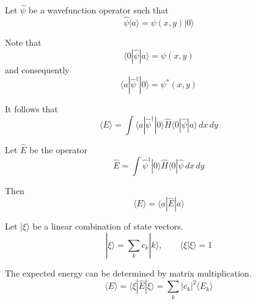 \documentclass[12pt]{article}
\begin{document}
\noindent
Let $\hat{\psi}$ be a wavefunction operator such that
\begin{equation*}
\hat{\psi}|a\rangle=\psi(x,y)|0\rangle
\end{equation*}

\noindent
Note that
\begin{equation*}
\langle0|\hat{\psi}|a\rangle=\psi(x,y)
\end{equation*}
and consequently
\begin{equation*}
\langle a|\hat{\psi}^\dag|0\rangle=\psi^*(x,y)
\end{equation*}

\noindent
It follows that
\begin{equation*}
\langle E\rangle=\int
\langle a|\hat{\psi}^\dag|0\rangle
\hat{H}
\langle0|\hat{\psi}|a\rangle
\,dx\,dy
\end{equation*}

\noindent
Let $\hat{E}$ be the operator
\begin{equation*}
\hat{E}=\int\hat{\psi}^\dag|0\rangle\hat{H}\langle0|\hat{\psi}\,dx\,dy
\end{equation*}

\noindent
Then
\begin{equation*}
\langle E\rangle=\langle a|\hat{E}|a\rangle
\end{equation*}

\noindent
Let $|\xi\rangle$ be a linear combination of state vectors.
\begin{equation*}
|\xi\rangle=\sum_kc_k|k\rangle,\qquad\langle\xi|\xi\rangle=1
\end{equation*}

\noindent
The expected energy can be determined by matrix multiplication.
\begin{equation*}
\langle E\rangle=\langle\xi|\hat{E}|\xi\rangle=\sum_k|c_k|^2\langle E_k\rangle
\end{equation*}
\end{document}
